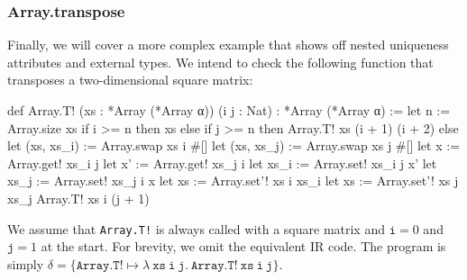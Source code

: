 \subsubsection{Array.transpose}
Finally, we will cover a more complex example that shows off nested uniqueness attributes and external types. We intend to check the following function that transposes a two-dimensional square matrix:\\
\begin{code}
def Array.T! (xs : *Array (*Array α)) (i j : Nat) 
  : *Array (*Array α) :=
  let n := Array.size xs
  if i >= n then
    xs
  else if j >= n then
    Array.T! xs (i + 1) (i + 2)
  else
    let (xs, xs_i) := Array.swap xs i #[]
    let (xs, xs_j) := Array.swap xs j #[]
    let x := Array.get! xs_i j
    let x' := Array.get! xs_j i
    let xs_i := Array.set! xs_i j x'
    let xs_j := Array.set! xs_j i x
    let xs := Array.set'! xs i xs_i
    let xs := Array.set'! xs j xs_j
    Array.T! xs i (j + 1)
\end{code}
We assume that \texttt{Array.T!} is always called with a square matrix and $\texttt{i} = 0$ and $\texttt{j} = 1$ at the start. For brevity, we omit the equivalent IR code. The program is simply $\delta = \{\texttt{Array.T!} \mapsto \lambda\ \texttt{xs}\ \texttt{i}\ \texttt{j}.\ \texttt{Array.T!}\ \texttt{xs}\ \texttt{i}\ \texttt{j}\}$.

